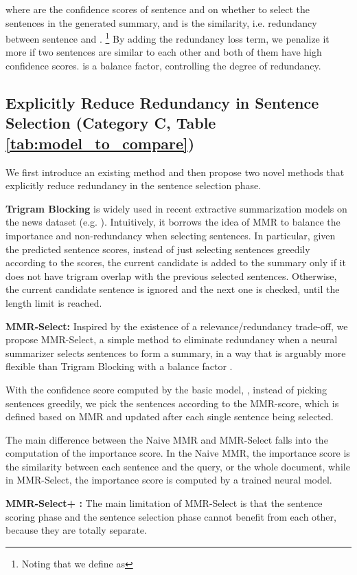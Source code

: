 \documentclass[11pt,a4paper]{article}
\begin{document}
where  are the confidence scores of sentence  and  on whether to select the sentences in the generated summary, and  is the similarity, i.e. redundancy between sentence  and . \footnote{Noting that we define  as } By adding the redundancy loss term, we penalize it more if two sentences are similar to each other and both of them have high confidence scores.  is a balance factor, controlling the degree of redundancy.
\vspace{-1mm}
\subsection{Explicitly Reduce Redundancy in Sentence Selection (Category C, Table \ref{tab:model_to_compare})}
We first introduce an existing method and then propose two novel methods that explicitly reduce redundancy in the sentence selection phase.

\textbf{Trigram Blocking} is widely used in  recent extractive summarization models on the news
dataset (e.g. \citet{liu-lapata-2019-text}). Intuitively, it borrows the idea of MMR to balance the importance and non-redundancy when selecting sentences. In particular, given the predicted sentence scores, instead of just selecting sentences greedily according to the scores, the current candidate is added to the summary only if it does not have trigram overlap with the previous selected sentences. Otherwise, the current candidate sentence is ignored and the next one is checked, until the length limit is reached.

\textbf{MMR-Select:}
Inspired by the existence of a relevance/redundancy trade-off, we propose MMR-Select, a simple method to eliminate redundancy when a neural summarizer selects sentences to form a summary, in a way that is arguably more flexible than Trigram Blocking with a balance factor .


 With the confidence score computed by the basic model, , instead of picking sentences greedily, we pick the sentences according to the MMR-score, which is defined based on MMR and updated after each single sentence being selected.
\vspace{-2mm}
 
The main difference between the Naive MMR and MMR-Select falls into the computation of the importance score. In the Naive MMR, the importance score is the similarity between each sentence and the query, or the whole document, while in MMR-Select, the importance score is computed by a trained neural model. 

\textbf{MMR-Select+ :}
The main limitation of MMR-Select is that the sentence scoring phase and the sentence selection phase cannot benefit from each other, because they are totally separate.
\end{document}
